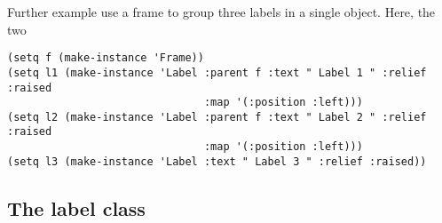 Further example use a frame to group three labels in a single object. Here,
the two 
\begin{verbatim}
(setq f (make-instance 'Frame))
(setq l1 (make-instance 'Label :parent f :text " Label 1 " :relief :raised 
                               :map '(:position :left)))
(setq l2 (make-instance 'Label :parent f :text " Label 2 " :relief :raised 
                               :map '(:position :left)))
(setq l3 (make-instance 'Label :text " Label 3 " :relief :raised))
\end{verbatim}

\subsection{The label class}

